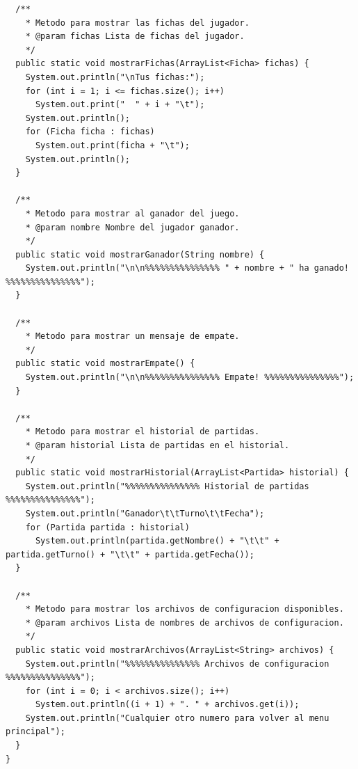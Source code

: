 \documentclass[12pt]{article}
\begin{document}
\begin{lstlisting}
  /**
    * Metodo para mostrar las fichas del jugador.
    * @param fichas Lista de fichas del jugador.
    */
  public static void mostrarFichas(ArrayList<Ficha> fichas) {
    System.out.println("\nTus fichas:");
    for (int i = 1; i <= fichas.size(); i++)
      System.out.print("  " + i + "\t");
    System.out.println();
    for (Ficha ficha : fichas)
      System.out.print(ficha + "\t");
    System.out.println();
  }

  /**
    * Metodo para mostrar al ganador del juego.
    * @param nombre Nombre del jugador ganador.
    */
  public static void mostrarGanador(String nombre) {
    System.out.println("\n\n%%%%%%%%%%%%%%% " + nombre + " ha ganado! %%%%%%%%%%%%%%%");
  }

  /**
    * Metodo para mostrar un mensaje de empate.
    */
  public static void mostrarEmpate() {
    System.out.println("\n\n%%%%%%%%%%%%%%% Empate! %%%%%%%%%%%%%%%");
  }

  /**
    * Metodo para mostrar el historial de partidas.
    * @param historial Lista de partidas en el historial.
    */
  public static void mostrarHistorial(ArrayList<Partida> historial) {
    System.out.println("%%%%%%%%%%%%%%% Historial de partidas %%%%%%%%%%%%%%%");
    System.out.println("Ganador\t\tTurno\t\tFecha");
    for (Partida partida : historial)
      System.out.println(partida.getNombre() + "\t\t" + partida.getTurno() + "\t\t" + partida.getFecha());
  }

  /**
    * Metodo para mostrar los archivos de configuracion disponibles.
    * @param archivos Lista de nombres de archivos de configuracion.
    */
  public static void mostrarArchivos(ArrayList<String> archivos) {
    System.out.println("%%%%%%%%%%%%%%% Archivos de configuracion %%%%%%%%%%%%%%%");
    for (int i = 0; i < archivos.size(); i++)
      System.out.println((i + 1) + ". " + archivos.get(i));
    System.out.println("Cualquier otro numero para volver al menu principal");
  }
}
  \end{lstlisting}
\end{document}

